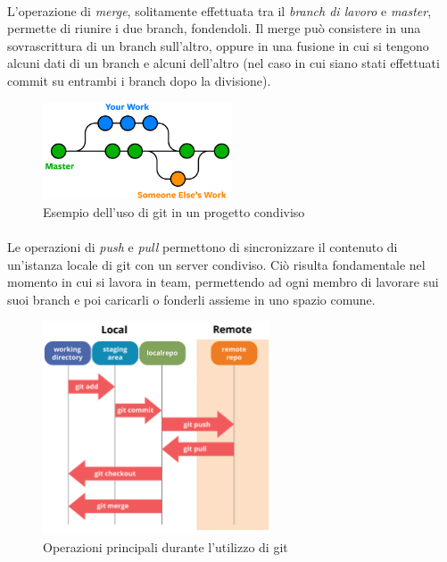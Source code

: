 \documentclass[12pt,a4paper,twoside,english,italian]{book}
\begin{document}
\paragraph{} L'operazione di \emph{merge}, solitamente effettuata tra il \emph{branch di lavoro} e \emph{master}, permette di riunire i due branch, fondendoli. Il merge può consistere in una sovrascrittura di un branch sull'altro, oppure in una fusione in cui si tengono alcuni dati di un branch e alcuni dell'altro (nel caso in cui siano stati effettuati commit su entrambi i branch dopo la divisione). 


\begin{figure}[H]
    \centering
    \includegraphics[width=0.5\textwidth]{img/git-condiviso.png}
    \caption{Esempio dell'uso di git in un progetto condiviso}
\end{figure}

\paragraph{} Le operazioni di \emph{push} e \emph{pull} permettono di sincronizzare il contenuto di un'istanza locale di git con un server condiviso. Ciò risulta fondamentale nel momento in cui si lavora in team, permettendo ad ogni membro di lavorare sui suoi branch e poi caricarli o fonderli assieme in uno spazio comune.


\begin{figure}[H]
    \centering
    \includegraphics[width=0.6\textwidth]{img/git-ops.png}
    \caption{Operazioni principali durante l'utilizzo di git}
\end{figure}
\end{document}
